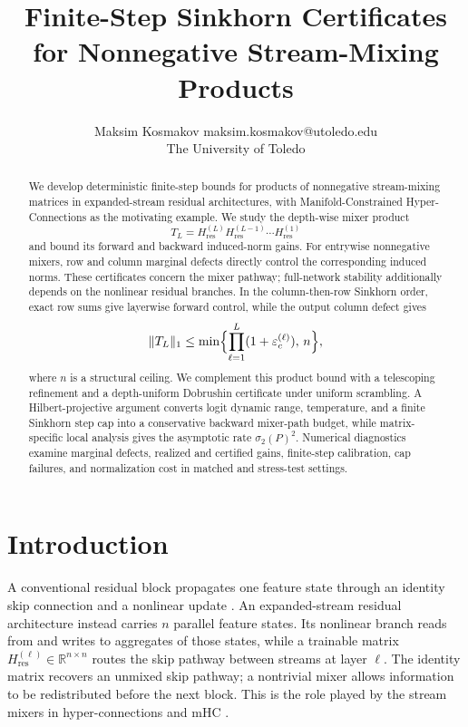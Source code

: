 \documentclass[10pt]{article}
\title{Finite-Step Sinkhorn Certificates for Nonnegative Stream-Mixing Products}
\author{\name Maksim Kosmakov \email maksim.kosmakov@utoledo.edu \\
\addr The University of Toledo}
\date{}
\numberwithin{equation}{section}
\theoremstyle{plain}
\theoremstyle{definition}
\theoremstyle{remark}
\newcommand{\R}{\mathbb{R}}
\newcommand{\Hres}{H_{\mathrm{res}}}
\begin{document}
\raggedbottom
\maketitle
\begingroup
\renewcommand{\thefootnote}{}
\endgroup

\begin{abstract}
We develop deterministic finite-step bounds for products of nonnegative
stream-mixing matrices in expanded-stream residual architectures, with
Manifold-Constrained Hyper-Connections as the motivating example. We study the
depth-wise mixer product
\[
        T_L=\Hres^{(L)}\Hres^{(L-1)}\cdots \Hres^{(1)}
\]
and bound its forward and backward induced-norm gains. For entrywise
nonnegative mixers, row and column marginal defects directly control the
corresponding induced norms. These certificates concern the mixer pathway;
full-network stability additionally depends on the nonlinear residual branches.
In the column-then-row Sinkhorn order, exact row
sums give layerwise forward control, while the output column defect gives
\[
 \|T_L\|_1\le
 \min\Bigl\{\prod_{\ell=1}^L(1+\varepsilon_c^{(\ell)}),\,n\Bigr\},
\]
where \(n\) is a structural ceiling. We complement this product bound with a
telescoping refinement and a depth-uniform Dobrushin certificate under uniform
scrambling. A Hilbert-projective argument converts logit dynamic range,
temperature, and a finite Sinkhorn step cap into a conservative backward
mixer-path budget, while matrix-specific local analysis gives the asymptotic
rate \(\sigma_2(P)^2\). Numerical diagnostics examine marginal defects,
realized and certified gains, finite-step calibration, cap failures, and
normalization cost in matched and stress-test settings.
\end{abstract}


\section{Introduction}\label{sec:intro}

A conventional residual block propagates one feature state through an identity
skip connection and a nonlinear update \citep{He2016ResNet}.  An expanded-stream
residual architecture instead carries \(n\) parallel feature states.  Its
nonlinear branch reads from and writes to aggregates of those states, while a
trainable matrix \(\Hres^{(\ell)}\in\R^{n\times n}\) routes the skip pathway
between streams at layer \(\ell\).  The identity matrix recovers an unmixed skip
pathway; a nontrivial mixer allows information to be redistributed before the
next block.  This is the role played by the stream mixers in hyper-connections
and mHC \citep{Xie2025mHC}.
\end{document}
